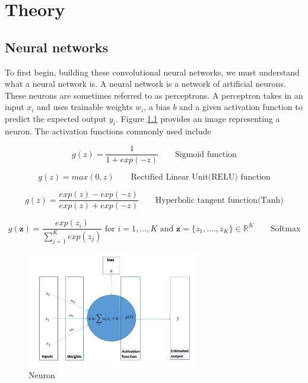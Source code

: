 \chapter{Theory}
\label{theory}
\section{Neural networks}
\label{theory}
To first begin, building these convolutional neural networks,  we must understand what a neural network is.
A neural network is a network of artificial neurons.
These neurons are sometimes referred to as perceptrons.
A perceptron takes in an input $x_i$ and uses trainable weights $w_i$, a bias $b$ and a given activation function to predict the expected output $y_i$.
Figure \ref{fig:neuron} provides an image representing a neuron. The activation functions commonly used include 

\begin{equation}
g(z) = \frac{1}{1+ exp(-z)}
 \qquad \text{Sigmoid function}
\end{equation}

\begin{equation}
g(z) = max(0,z)
 \qquad \text{Rectified Linear Unit(RELU) function}
\end{equation}

\begin{equation}
g(z) = \frac{exp(z)-exp(-z)}{exp(z) + exp(-z)}
 \qquad \text{Hyperbolic tangent function(Tanh)}
\end{equation}

\begin{equation}
g(\mathbf{z}) = \frac{exp(z_i)}{\sum_{j=1}^{K}exp(z_j)} \textrm{ for } i = 1,...,K \textrm{ and } \mathbf{z} = \{ z_1,....,z_K \} \in \mathbb{R}^K
 \qquad \text{Softmax}
\end{equation}

\begin{figure}
\centering
  \includegraphics[width=75mm,scale=0.75]{neuron.PNG}
  \caption{Neuron}
  \label{fig:neuron}
\end{figure}

